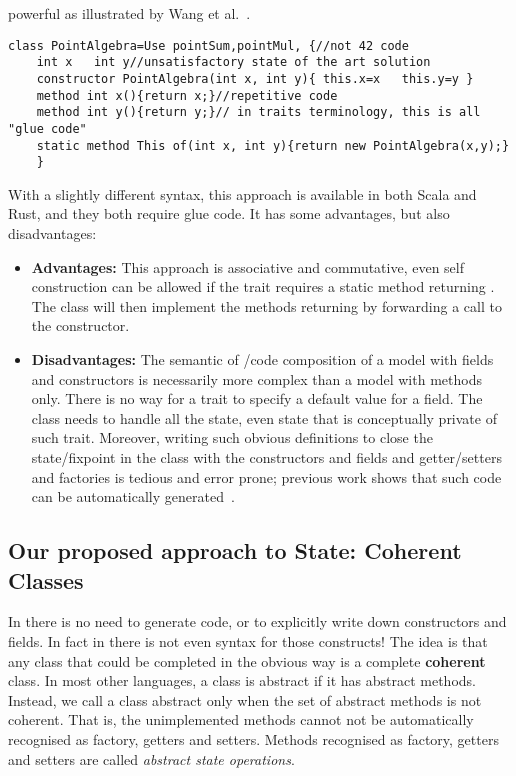 powerful as illustrated by Wang et al.~\cite{wang2016classless}.
\begin{lstlisting}
class PointAlgebra=Use pointSum,pointMul, {//not 42 code
    int x   int y//unsatisfactory state of the art solution
    constructor PointAlgebra(int x, int y){ this.x=x   this.y=y }
    method int x(){return x;}//repetitive code
    method int y(){return y;}// in traits terminology, this is all "glue code"
    static method This of(int x, int y){return new PointAlgebra(x,y);}
    }
\end{lstlisting}

\noindent 

With a slightly different syntax, this approach is available in both Scala and Rust, and they both require glue code.
It has some advantages, but also disadvantages: 

\begin{itemize}

\item {\bf Advantages:} This approach is associative and commutative, even self construction
  can be allowed if the trait requires a static method
  returning \Q@This@. The class will then implement the methods returning \Q@This@
  by forwarding a call to the constructor.
  
\item {\bf Disadvantages:}
   The semantic of \Q@Use@/code composition of a model with fields and constructors is necessarily
   more complex than a model with methods only.
 There is no way for a trait to specify a default value for a field.
The class needs to handle all the state, even state that is conceptually
   private of such trait. 
 Moreover, writing such obvious definitions to close
  the state/fixpoint in the class 
   with the constructors and fields and getter/setters and factories is tedious and error prone; previous work shows that such code can be automatically
   generated~\cite{wang2016classless}.
\end{itemize}

\subsection{Our proposed approach to State: Coherent Classes}

In \name there is no need to generate
code, or to explicitly write down constructors and fields. In fact in
\name there is not even syntax for those constructs!  The idea is that
any class that could be completed in the obvious way  is a
  complete \textbf{coherent} class.  In most other languages, a class is
abstract if it has abstract methods.  Instead, we call a class
abstract only when the set of abstract methods is not coherent. That
is, the unimplemented methods cannot not be automatically recognised
as factory, getters and setters. Methods recognised as factory, getters and setters are called
\emph{abstract state operations}.
  
